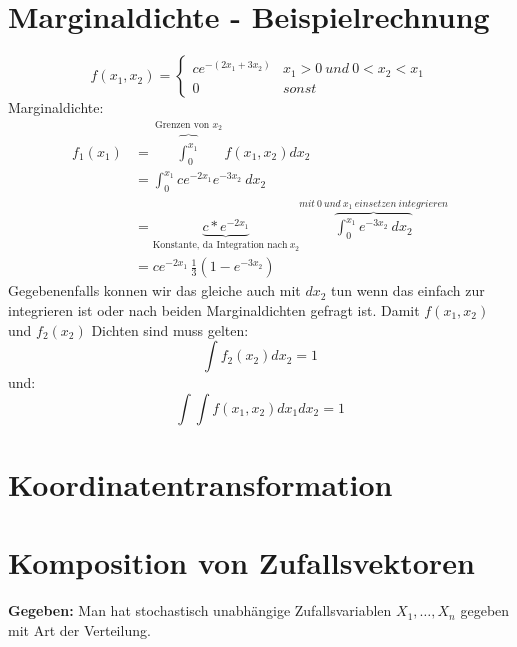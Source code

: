 \documentclass{article}
\begin{document}
\section{Marginaldichte - Beispielrechnung}
\[	
	f(x_1,x_2)=
	\begin{cases}
		ce^{-(2x_1+3x_2)} & x_1  > 0 \: und \: 0 < x_2 <x_1 \\
		0 & sonst
	\end{cases}
\]
Marginaldichte:
\[
	\begin{split}
		f_1(x_1) 	& = \overbrace{\int_{0}^{x_1}}^{\text{Grenzen von }x_2} f(x_1,x_2) dx_2 \\
							  & = \int_{0}^{x_1} ce^{-2x_1}e^{-3x_2} \: dx_2 \\
						   & = \underbrace{c*e^{-2x_1}}_{\text{Konstante, da Integration nach} \: x_2}
		\overbrace{\int_{0}^{x_1} e^{-3x_2} \: dx_2}^{mit \: 0 \: und \: x_1 \: einsetzen \: integrieren} \\
		& = ce^{-2x_1}\, \frac{1}{3} (1-e^{-3x_2} )
	\end{split}
\]
Gegebenenfalls konnen wir das gleiche auch mit $dx_2$ tun wenn das einfach zur integrieren ist oder nach beiden Marginaldichten gefragt ist.
Damit $f(x_1,x_2)$ und $f_2(x_2)$ Dichten sind muss gelten:
\[
	\int f_2(x_2) dx_2 = 1
\]
und:
\[
	\int \int f(x_1,x_2) dx_1 dx_2 = 1
\]
\section{Koordinatentransformation}
\section{Komposition von Zufallsvektoren}
\begin{center}
\end{center}
\vspace*{7pt}
\textbf{Gegeben:} Man hat stochastisch unabhängige Zufallsvariablen $X_1, \ldots , X_n$ gegeben mit
Art der Verteilung.
\end{document}
